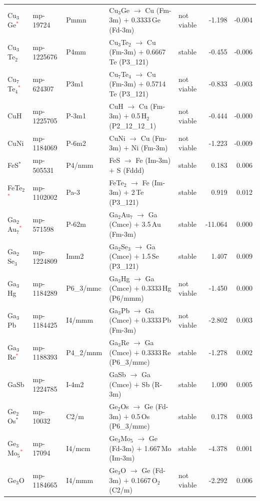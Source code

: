 \begin{longtable}{@{}ll l@{\hspace{4pt}} p{4.6cm} l@{\hspace{4pt}} rr@{}}
Cu$_{3}$Ge\textcolor{red}{$^*$} & mp-19724 & Pmmn & Cu$_{3}$Ge $\to$ Cu (Fm-3m) $+$ 0.3333\,Ge (Fd-3m) & not viable & -1.198 & -0.004 \\
Cu$_{3}$Te$_{2}$ & mp-1225676 & P4mm & Cu$_{3}$Te$_{2}$ $\to$ Cu (Fm-3m) $+$ 0.6667\,Te (P3\_121) & stable & -0.455 & -0.006 \\
Cu$_{7}$Te$_{4}$\textcolor{red}{$^*$} & mp-624307 & P3m1 & Cu$_{7}$Te$_{4}$ $\to$ Cu (Fm-3m) $+$ 0.5714\,Te (P3\_121) & not viable & -0.833 & -0.003 \\
CuH & mp-1225705 & P-3m1 & CuH $\to$ Cu (Fm-3m) $+$ 0.5\,H$_{2}$ (P2\_12\_12\_1) & not viable & -0.444 & -0.000 \\
CuNi & mp-1184069 & P-6m2 & CuNi $\to$ Cu (Fm-3m) $+$ Ni (Fm-3m) & not viable & -1.223 & -0.009 \\
FeS$^*$ & mp-505531 & P4/nmm & FeS $\to$ Fe (Im-3m) $+$ S (Fddd) & stable & 0.183 & 0.006 \\
FeTe$_{2}$\textcolor{red}{$^*$} & mp-1102002 & Pa-3 & FeTe$_{2}$ $\to$ Fe (Im-3m) $+$ 2\,Te (P3\_121) & stable & 0.919 & 0.012 \\
Ga$_{2}$Au$_{7}$\textcolor{red}{$^*$} & mp-571598 & P-62m & Ga$_{2}$Au$_{7}$ $\to$ Ga (Cmce) $+$ 3.5\,Au (Fm-3m) & stable & -11.064 & 0.000 \\
Ga$_{2}$Se$_{3}$ & mp-1224809 & Imm2 & Ga$_{2}$Se$_{3}$ $\to$ Ga (Cmce) $+$ 1.5\,Se (P3\_121) & stable & 1.407 & 0.009 \\
Ga$_{3}$Hg & mp-1184289 & P6\_3/mmc & Ga$_{3}$Hg $\to$ Ga (Cmce) $+$ 0.3333\,Hg (P6/mmm) & not viable & -1.450 & 0.000 \\
Ga$_{3}$Pb & mp-1184425 & I4/mmm & Ga$_{3}$Pb $\to$ Ga (Cmce) $+$ 0.3333\,Pb (Fm-3m) & not viable & -2.802 & 0.003 \\
Ga$_{3}$Re\textcolor{red}{$^*$} & mp-1188393 & P4\_2/mnm & Ga$_{3}$Re $\to$ Ga (Cmce) $+$ 0.3333\,Re (P6\_3/mmc) & stable & -1.278 & 0.002 \\
GaSb & mp-1224785 & I-4m2 & GaSb $\to$ Ga (Cmce) $+$ Sb (R-3m) & stable & 1.090 & 0.005 \\
Ge$_{2}$Os$^*$ & mp-10032 & C2/m & Ge$_{2}$Os $\to$ Ge (Fd-3m) $+$ 0.5\,Os (P6\_3/mmc) & stable & 0.178 & 0.003 \\
Ge$_{3}$Mo$_{5}$\textcolor{red}{$^*$} & mp-17094 & I4/mcm & Ge$_{3}$Mo$_{5}$ $\to$ Ge (Fd-3m) $+$ 1.667\,Mo (Im-3m) & stable & -4.378 & 0.001 \\
Ge$_{3}$O & mp-1184665 & I4/mmm & Ge$_{3}$O $\to$ Ge (Fd-3m) $+$ 0.1667\,O$_{2}$ (C2/m) & not viable & -2.292 & 0.006 \\

\end{longtable}
